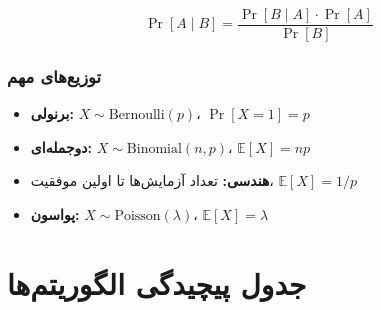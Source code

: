 \documentclass{matinbook}
\begin{document}
    \begin{theorem}
        \[
        \Pr[A \mid B] = \frac{\Pr[B \mid A] \cdot \Pr[A]}{\Pr[B]}
        \]
        \label{thm:bayes}
    \end{theorem}
    
    \subsection{توزیع‌های مهم}
    
    \begin{itemize}
        \item \textbf{برنولی:} $X \sim \text{Bernoulli}(p)$،
        $\Pr[X=1] = p$
        \item \textbf{دوجمله‌ای:} $X \sim \text{Binomial}(n, p)$،
        $\mathbb{E}[X] = np$
        \item \textbf{هندسی:} تعداد آزمایش‌ها تا اولین موفقیت،
        $\mathbb{E}[X] = 1/p$
        \item \textbf{پواسون:} $X \sim \text{Poisson}(\lambda)$،
        $\mathbb{E}[X] = \lambda$
    \end{itemize}
    
    \chapter{جدول پیچیدگی الگوریتم‌ها}
    \label{app:complexity-table}
    
\end{document}

